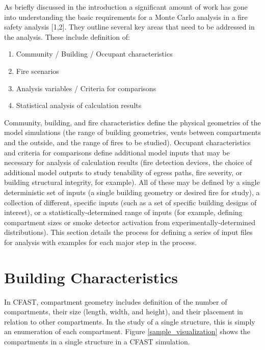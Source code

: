 \documentclass[12pt,twoside]{book}
\begin{document}
As briefly discussed in the introduction a significant amount of work has gone into understanding the basic requirements for a Monte Carlo analysis in a fire safety analysis [1,2]. They outline several key areas that need to be addressed in the analysis.  These include definition of:

\begin{enumerate}
  \item Community / Building / Occupant characteristics
  \item Fire scenarios
  \item Analysis variables / Criteria for comparisons
  \item Statistical analysis of calculation results
\end{enumerate}

Community, building, and fire characteristics define the physical geometries of the model simulations (the range of building geometries, vents between compartments and the outside, and the range of fires to be studied). Occupant characteristics and criteria for comparisons define additional model inputs that may be necessary for analysis of calculation results (fire detection devices, the choice of additional model outputs to study tenability of egress paths, fire severity, or building structural integrity, for example). All of these may be defined by a single deterministic set of inputs (a single building geometry or desired fire for study), a collection of different, specific inputs (such as a set of specific building designs of interest), or a statistically-determined range of inputs (for example, defining compartment sizes or smoke detector activation from experimentally-determined distributions). This section details the process for defining a series of input files for analysis with examples for each major step in the process.

\section{Building Characteristics}

In CFAST, compartment geometry includes definition of the number of compartments, their size (length, width, and height), and their placement in relation to other compartments. In the study of a single structure, this is simply an enumeration of each compartment. Figure \ref{sample_visualization} shows the compartments in a single structure in a CFAST simulation.
\end{document}
